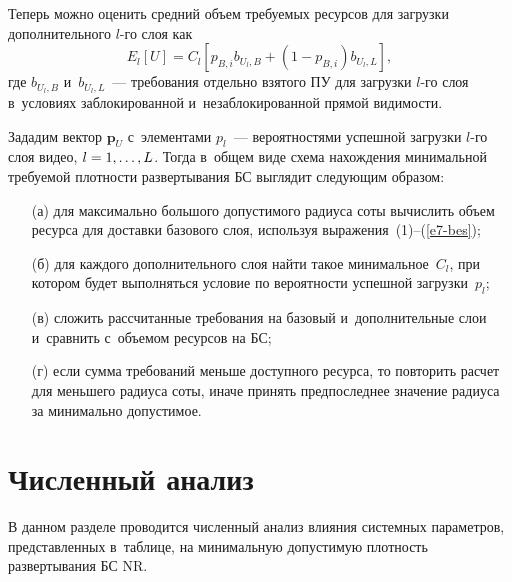 \begin{multicols}{2}
  Теперь можно оценить средний объем тре\-бу\-емых ресурсов для загрузки 
дополнительного $l$-го слоя как
  \begin{equation*}
  E_l[U]=C_l \left[ p_{B,i} b_{U_l,B} +\left( 1-p_{B,i}\right) b_{U_l,L}\right],
  \end{equation*}
где $b_{U_l,B}$ и~$b_{U_l,L}$~--- требования отдельно взятого ПУ для 
загрузки $l$-го слоя в~условиях заблокированной и~незаблокированной прямой 
видимости. 
  
  Зададим вектор $\mathbf{p}_U$ с~элементами $p_l$~---  вероятностями 
успешной загрузки $l$-го слоя видео, $l\hm=1,\ldots , L$. Тогда в~общем виде 
схема нахождения минимальной требуемой плот\-ности развертывания БС 
выглядит следующим образом: 
\begin{itemize}
\item[(а)] для максимально большого допустимого 
радиуса соты вы\-чис\-лить объем ресурса для доставки базового слоя, используя 
выражения~(1)--(\ref{e7-bes}); 
\item[(б)] для каждого дополнительного слоя найти 
такое минимальное~$C_l$, при котором будет выполняться условие по 
ве\-ро\-ят\-ности успешной загрузки~$p_l$; 
\item[(в)] сложить рассчитанные требования на 
базовый и~дополнительные слои и~сравнить с~объемом ресурсов на БС; 
\item[(г)] если сумма требований меньше доступного ресурса, то повторить расчет для 
меньшего радиуса соты, иначе принять предпоследнее значение радиуса за 
минимально до\-пус\-ти\-мое.
\end{itemize}

\section{Численный анализ}
  
  В данном разделе проводится численный анализ влияния системных 
параметров, представленных в~таблице, на минимальную допустимую 
плотность развертывания БС NR.
  

\end{multicols}
